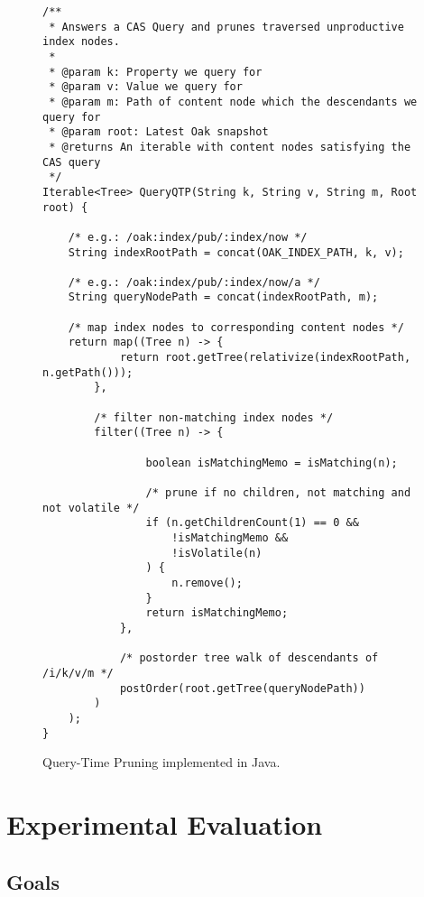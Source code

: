 \documentclass[abstracton,12pt]{scrartcl}
\theoremstyle{definition}
\begin{document}
\begin{figure}[H]
  \scriptsize
  \begin{framed}    
\begin{verbatim}
/**
 * Answers a CAS Query and prunes traversed unproductive index nodes.
 *
 * @param k: Property we query for
 * @param v: Value we query for
 * @param m: Path of content node which the descendants we query for
 * @param root: Latest Oak snapshot
 * @returns An iterable with content nodes satisfying the CAS query
 */
Iterable<Tree> QueryQTP(String k, String v, String m, Root root) {

    /* e.g.: /oak:index/pub/:index/now */
    String indexRootPath = concat(OAK_INDEX_PATH, k, v); 

    /* e.g.: /oak:index/pub/:index/now/a */
    String queryNodePath = concat(indexRootPath, m);

    /* map index nodes to corresponding content nodes */
    return map((Tree n) -> {
            return root.getTree(relativize(indexRootPath, n.getPath()));
        },

        /* filter non-matching index nodes */
        filter((Tree n) -> {
                
                boolean isMatchingMemo = isMatching(n);

                /* prune if no children, not matching and not volatile */
                if (n.getChildrenCount(1) == 0 &&
                    !isMatchingMemo &&
                    !isVolatile(n)
                ) {
                    n.remove();
                }
                return isMatchingMemo;
            },

            /* postorder tree walk of descendants of /i/k/v/m */
            postOrder(root.getTree(queryNodePath))
        )
    );
}
\end{verbatim}
  \end{framed}
  \caption[QTP implemented in Java]{Query-Time Pruning implemented in Java.}
  \label{fig:java_qtp}
\end{figure}

\newpage\null\thispagestyle{empty}\newpage

\section{Experimental Evaluation}

\label{sec:experimental-evaluation}

\subsection{Goals}
\end{document}
